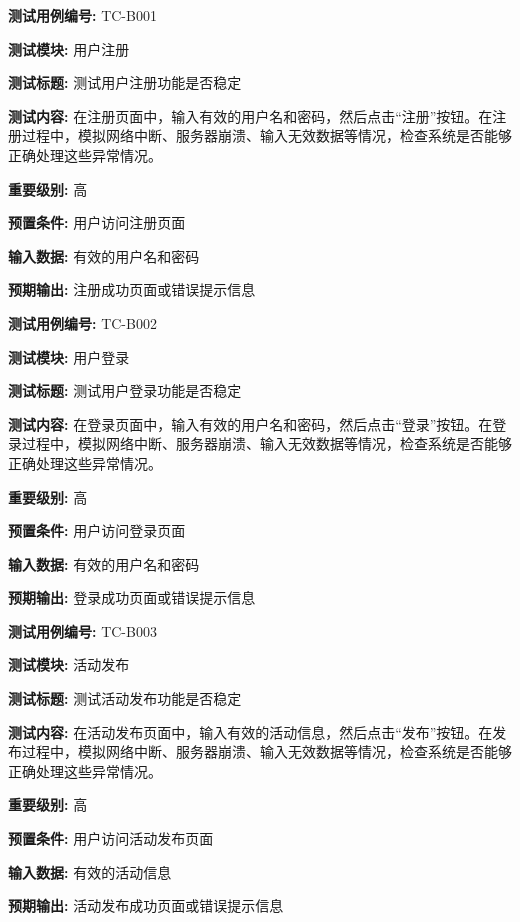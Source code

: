 \begin{framed} \textbf{测试用例编号:} TC-B001

\textbf{测试模块:} 用户注册

\textbf{测试标题:} 测试用户注册功能是否稳定

\textbf{测试内容:} 在注册页面中，输入有效的用户名和密码，然后点击“注册”按钮。在注册过程中，模拟网络中断、服务器崩溃、输入无效数据等情况，检查系统是否能够正确处理这些异常情况。

\textbf{重要级别:} 高

\textbf{预置条件:} 用户访问注册页面

\textbf{输入数据:} 有效的用户名和密码

\textbf{预期输出:} 注册成功页面或错误提示信息

\begin{center}  \end{center} \end{framed}

\begin{framed} \textbf{测试用例编号:} TC-B002

\textbf{测试模块:} 用户登录

\textbf{测试标题:} 测试用户登录功能是否稳定

\textbf{测试内容:} 在登录页面中，输入有效的用户名和密码，然后点击“登录”按钮。在登录过程中，模拟网络中断、服务器崩溃、输入无效数据等情况，检查系统是否能够正确处理这些异常情况。

\textbf{重要级别:} 高

\textbf{预置条件:} 用户访问登录页面

\textbf{输入数据:} 有效的用户名和密码

\textbf{预期输出:} 登录成功页面或错误提示信息

\begin{center}  \end{center} \end{framed}

\begin{framed} \textbf{测试用例编号:} TC-B003

\textbf{测试模块:} 活动发布

\textbf{测试标题:} 测试活动发布功能是否稳定

\textbf{测试内容:} 在活动发布页面中，输入有效的活动信息，然后点击“发布”按钮。在发布过程中，模拟网络中断、服务器崩溃、输入无效数据等情况，检查系统是否能够正确处理这些异常情况。

\textbf{重要级别:} 高

\textbf{预置条件:} 用户访问活动发布页面

\textbf{输入数据:} 有效的活动信息

\textbf{预期输出:} 活动发布成功页面或错误提示信息

\begin{center}  \end{center} \end{framed}

